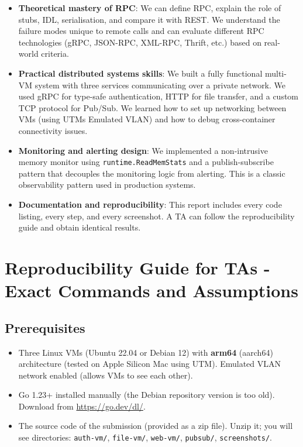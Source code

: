 \documentclass[a4paper]{article}
\begin{document}
\begin{itemize}
    \item \textbf{Theoretical mastery of RPC}: We can define RPC, explain the role of stubs, IDL, serialisation, and compare it with REST. We understand the failure modes unique to remote calls and can evaluate different RPC technologies (gRPC, JSON-RPC, XML-RPC, Thrift, etc.) based on real-world criteria.
    \item \textbf{Practical distributed systems skills}: We built a fully functional multi-VM system with three services communicating over a private network. We used gRPC for type-safe authentication, HTTP for file transfer, and a custom TCP protocol for Pub/Sub. We learned how to set up networking between VMs (using UTMs Emulated VLAN) and how to debug cross-container connectivity issues.
    \item \textbf{Monitoring and alerting design}: We implemented a non-intrusive memory monitor using \texttt{runtime.ReadMemStats} and a publish-subscribe pattern that decouples the monitoring logic from alerting. This is a classic observability pattern used in production systems.
    \item \textbf{Documentation and reproducibility}: This report includes every code listing, every step, and every screenshot. A TA can follow the reproducibility guide and obtain identical results.
\end{itemize}

\section{Reproducibility Guide for TAs - Exact Commands and Assumptions}
\subsection{Prerequisites}
\begin{itemize}
    \item Three Linux VMs (Ubuntu 22.04 or Debian 12) with \textbf{arm64} (aarch64) architecture (tested on Apple Silicon Mac using UTM). Emulated VLAN network enabled (allows VMs to see each other).
    \item Go 1.23+ installed manually (the Debian repository version is too old). Download from \url{https://go.dev/dl/}.
    \item The source code of the submission (provided as a zip file). Unzip it; you will see directories: \texttt{auth-vm/}, \texttt{file-vm/}, \texttt{web-vm/}, \texttt{pubsub/}, \texttt{screenshots/}.
\end{itemize}
\end{document}
